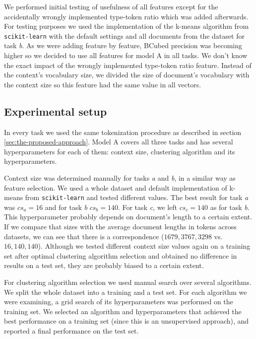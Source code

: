\documentclass[10pt, a4paper]{article}
\begin{document}
We performed initial testing of usefulness of all features except for the accidentally wrongly implemented type-token ratio which was added afterwards. For testing purposes we used the implementation of the k-means algorithm from \texttt{scikit-learn} with the default settings and all documents from the dataset for task \emph{b}. As we were adding feature by feature, BCubed precision was becoming higher so we decided to use all features for model A in all tasks. We don't know the exact impact of the wrongly implemented type-token ratio feature. Instead of the context's vocabulary size, we divided the size of document's vocabulary with the context size so this feature had the same value in all vectors.


\subsection{Experimental setup}
In every task we used the same tokenization procedure as described in section \ref{sec:the-proposed-approach}. Model A covers all three tasks and has several hyperparameters for each of them: context size, clustering algorithm and its hyperparameters.

Context size was determined manually for tasks \emph{a} and \emph{b}, in a similar way as feature selection. We used a whole dataset and default implementation of k-means from \texttt{scikit-learn} and tested different values. The best result for task \emph{a} was $cs_a=16$ and for task \emph{b} $cs_b=140$. For task \emph{c}, we left $cs_c=140$ as for task \emph{b}. This hyperparameter probably depends on document's length to a certain extent. If we compare that sizes with the average document lengths in tokens across datasets, we can see that there is a correspondence ($1679, 3767, 3298$ vs. $16, 140, 140$). Although we tested different context size values again on a training set after optimal clustering algorithm selection and obtained no difference in results on a test set, they are probably biased to a certain extent.

For clustering algorithm selection we used manual search over several algorithms. We split the whole dataset into a training and a test set. For each algorithm we were examining, a grid search of its hyperparameters was performed on the training set. We selected an algorithm and hyperparameters that achieved the best performance on a training set (since this is an unsupervised approach), and reported a final performance on the test set.
\end{document}
